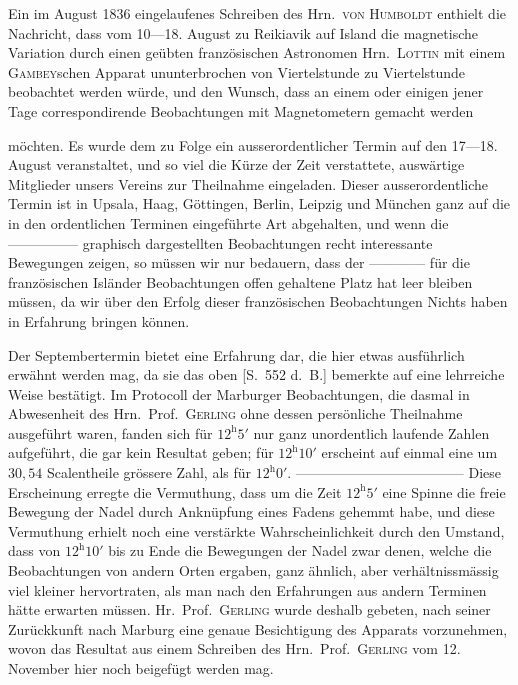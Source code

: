 Ein im August 1836 eingelaufenes Schreiben des Hrn.\ \textsc{von Humboldt} enthielt die Nachricht, dass vom 10---18. August zu Reikiavik auf Island die magnetische Variation durch einen geübten französischen Astronomen Hrn.\ \textsc{Lottin} mit einem \textsc{Gambey}schen Apparat ununterbrochen von Viertelstunde zu Viertelstunde beobachtet werden würde, und den Wunsch, dass an einem oder einigen jener Tage correspondirende Beobachtungen mit Magnetometern gemacht werden
\par
\clearpage
{}
\noindent möchten. Es wurde dem zu Folge ein ausserordentlicher Termin auf den 17---18. August veranstaltet, und so viel die Kürze der Zeit verstattete, auswärtige Mitglieder unsers Vereins zur Theilnahme eingeladen. Dieser ausserordentliche Termin ist in Upsala, Haag, Göttingen, Berlin, Leipzig und München ganz auf die in den ordentlichen Terminen eingeführte Art abgehalten, und wenn die ---\quad---\quad---\quad---\quad--- graphisch dargestellten Beobachtungen recht interessante Bewegungen zeigen, so müssen wir nur bedauern, dass der ---\quad---\quad---\quad--- für die französischen Isländer Beobachtungen offen gehaltene Platz hat leer bleiben müssen, da wir über den Erfolg dieser französischen Beobachtungen Nichts haben in Erfahrung bringen können.

Der Septembertermin bietet eine Erfahrung dar, die hier etwas ausführlich erwähnt werden mag, da sie das oben [S.\ 552 d.\ B.] bemerkte auf eine lehrreiche Weise bestätigt. Im Protocoll der Marburger Beobachtungen, die dasmal in Abwesenheit des Hrn.\ Prof.\ \textsc{Gerling} ohne dessen persönliche Theilnahme ausgeführt waren, fanden sich für $12^{\mathrm h}5'$ nur ganz unordentlich laufende Zahlen aufgeführt, die gar kein Resultat geben; für $12^{\mathrm h}10'$ erscheint auf einmal eine um $30{,}54$ Scalentheile grössere Zahl, als für $12^{\mathrm h}0'$. ---\quad---\quad---\quad---\quad---\quad---\quad---\quad---\quad---\quad---\quad---\quad--- Diese Erscheinung erregte die Vermuthung, dass um die Zeit $12^{\mathrm h}5'$ eine Spinne die freie Bewegung der Nadel durch Anknüpfung eines Fadens gehemmt habe, und diese Vermuthung erhielt noch eine verstärkte Wahrscheinlichkeit durch den Umstand, dass von $12^{\mathrm h}10'$ bis zu Ende die Bewegungen der Nadel zwar denen, welche die Beobachtungen von andern Orten ergaben, ganz ähnlich, aber verhältnissmässig viel kleiner hervortraten, als man nach den Erfahrungen aus andern Terminen hätte erwarten müssen. Hr.\ Prof.\ \textsc{Gerling} wurde deshalb gebeten, nach seiner Zurückkunft nach Marburg eine genaue Besichtigung des Apparats vorzunehmen, wovon das Resultat aus einem Schreiben des Hrn.\ Prof.\ \textsc{Gerling} vom 12. November hier noch beigefügt werden mag.

